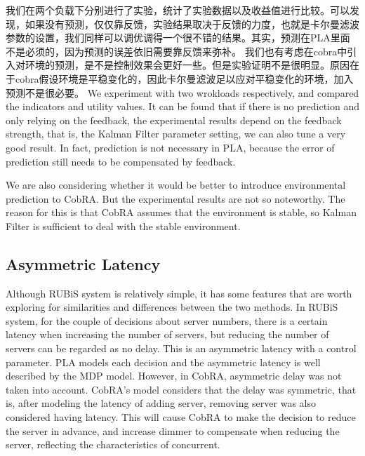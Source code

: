 \documentclass[sigconf]{acmart}
\begin{document}
我们在两个负载下分别进行了实验，统计了实验数据以及收益值进行比较。可以发现，如果没有预测，仅仅靠反馈，实验结果取决于反馈的力度，也就是卡尔曼滤波参数的设置，我们同样可以调优调得一个很不错的结果。其实，预测在PLA里面不是必须的，因为预测的误差依旧需要靠反馈来弥补。
我们也有考虑在cobra中引入对环境的预测，是不是控制效果会更好一些。但是实验证明不是很明显。原因在于cobra假设环境是平稳变化的，因此卡尔曼滤波足以应对平稳变化的环境，加入预测不是很必要。
We experiment with two wrokloads respectively, and compared the indicators and utility values.
It can be found that if there is no prediction and only relying on the feedback, the experimental results depend on the feedback strength, that is, the Kalman Filter parameter setting, we can also tune a very good result.
In fact, prediction is not necessary in PLA, because the error of prediction still needs to be compensated by feedback.

We are also considering whether it would be better to introduce environmental prediction to CobRA.
But the experimental results are not so noteworthy.
The reason for this is that CobRA assumes that the environment is stable, so Kalman Filter is sufficient to deal with the stable environment.
\subsection{Asymmetric Latency}
Although RUBiS system is relatively simple, it has some features that are worth exploring for similarities and differences between the two methods.
In RUBiS system, for the couple of decisions about server numbers, there is a certain latency when increasing the number of servers, but reducing the number of servers can be regarded as no delay. This is an asymmetric latency with a control parameter.
PLA models each decision and the asymmetric latency is well described by the MDP model.
However, in CobRA, asymmetric delay was not taken into account. CobRA's model considers that the delay was symmetric, that is, after modeling the latency of adding server, removing server was also considered having latency.
This will cause CobRA to make the decision to reduce the server in advance, and increase dimmer to compensate when reducing the server, reflecting the characteristics of concurrent.
\end{document}

